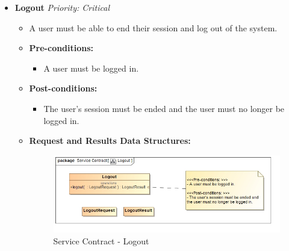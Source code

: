 \documentclass{article}
\begin{document}
\begin{itemize}
					\cleardoublepage
					\item \textbf{Logout} \hfill \textit{Priority: Critical}
					\begin{itemize}
						\item A user must be able to end their session and log out of the system.
						\item \textbf{Pre-conditions:}
						\begin{itemize}
							\item A user must be logged in.
						\end{itemize}
						\item \textbf{Post-conditions:}
						\begin{itemize}
							\item The user's session must be ended and the user must no longer be logged in.
						\end{itemize}
						\item \textbf{Request and Results Data Structures:}
						\begin{figure}[H]
							\includegraphics[width=\linewidth]{../Diagrams/ServiceContracts/Logout.jpg}
							\caption{Service Contract - Logout}
						\end{figure}
					\end{itemize}
					

\end{itemize}
\end{document}
